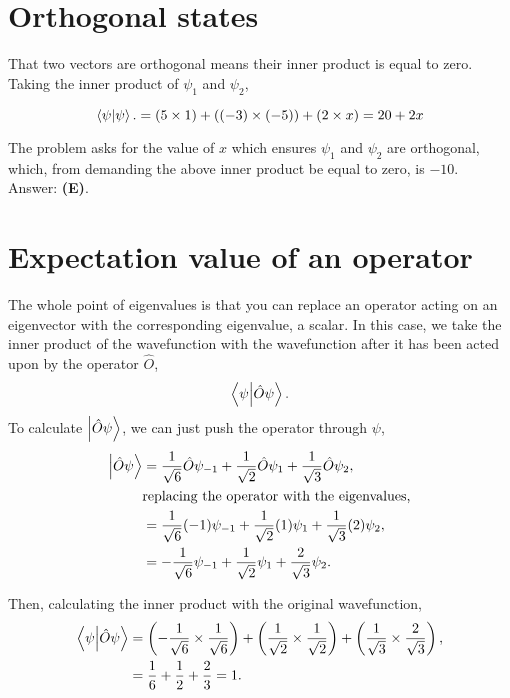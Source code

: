 \documentclass[11pt]{paper}
\newcommand{\answer}[1]{Answer: \textbf{(#1)}.}
\begin{document}
\section{Orthogonal states}
That two vectors are orthogonal means their inner product is equal to zero.  Taking the inner product of $\psi_1$ and $\psi_2$,

\begin{equation}
\bra{\psi}\ket{\psi}. = (5 \times 1) + ((-3) \times (-5)) + (2 \times x) = 20+2x
\end{equation}

The problem asks for the value of $x$ which ensures $\psi_1$ and $\psi_2$ are orthogonal, which, from demanding the above inner product be equal to zero, is $-10$.\\

\answer{E}

\section{Expectation value of an operator}
The whole point of eigenvalues is that you can replace an operator acting on an eigenvector with the corresponding eigenvalue, a scalar.  In this case, we take the inner product of the wavefunction with the wavefunction after it has been acted upon by the operator $\hat{O}$,
\begin{equation}
\bra{\psi}\ket{ \hat{O} \psi}.
\end{equation}
To calculate $\ket{\hat{O} \psi}$, we can just push the operator through $\psi$,
\begin{align}
\ket{\hat{O} \psi} &= \frac{1}{\sqrt{6}} \hat{O} \psi_{-1} + \frac{1}{\sqrt{2}} \hat{O} \psi_{1} + \frac{1}{\sqrt{3}} \hat{O} \psi_{2},\\
&\text{replacing the operator with the eigenvalues,}\\
&= \frac{1}{\sqrt{6}} (-1)  \psi_{-1} + \frac{1}{\sqrt{2}} (1)  \psi_{1}+ \frac{1}{\sqrt{3}} (2)  \psi_{2},\\
&= -\frac{1}{\sqrt{6}} \psi_{-1} + \frac{1}{\sqrt{2}}  \psi_{1}+ \frac{2}{\sqrt{3}}\psi_{2}.
\end{align}

Then, calculating the inner product with the original wavefunction,
\begin{align}
\bra{\psi}\ket{ \hat{O} \psi} &= \left(-\frac{1}{\sqrt{6}} \times \frac{1}{\sqrt{6}}\right) + \left(\frac{1}{\sqrt{2}}  \times \frac{1}{\sqrt{2}} \right) + \left(\frac{1}{\sqrt{3}} \times \frac{2}{\sqrt{3}}\right),\\
&= \frac{1}{6} + \frac{1}{2}+ \frac{2}{3} = 1.
\end{align}
\end{document}
